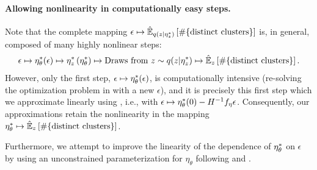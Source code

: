 \paragraph{Allowing nonlinearity in computationally easy steps.}
%
Note that the complete mapping
$\epsilon \mapsto \hat{\mathbb{E}}_{{q(z \vert \eta_z^{*})}}
\left[ \#\{\text{distinct clusters}\} \right]$
is, in general, composed of many highly nonlinear steps:
%
\begin{align*}
\epsilon \mapsto
\eta_\theta^{*}(\epsilon) \mapsto
\eta_z^{*}\left(\eta_\theta^{*}\right) \mapsto
\textrm{Draws from }z \sim q(z \vert \eta_z^{*}) \mapsto
\hat{\mathbb{E}}_z \left[ \#\{\text{distinct clusters}\} \right].
\end{align*}
%
However, only the first step, $\epsilon \mapsto \eta_\theta^{*}(\epsilon)$, is
computationally intensive (re-solving the optimization problem in
 with a new $\epsilon$), and it is precisely
this first step which we approximate linearly using
, i.e., with $\epsilon \mapsto \eta_\theta^{*}(0) -
H^{-1} f_\eta \epsilon$. Consequently, our approximations retain the
nonlinearity in the mapping $\eta_\theta^{*} \mapsto \hat{\mathbb{E}}_z \left[
\#\{\text{distinct clusters}\} \right]$.

Furthermore, we attempt to improve the linearity of the dependence of
$\eta_\theta^{*}$ on $\epsilon$ by using an unconstrained parameterization for
$\eta_\theta$ following \citet{stan-manual:2015} and \citet{kucukelbir:2015:advi}.
